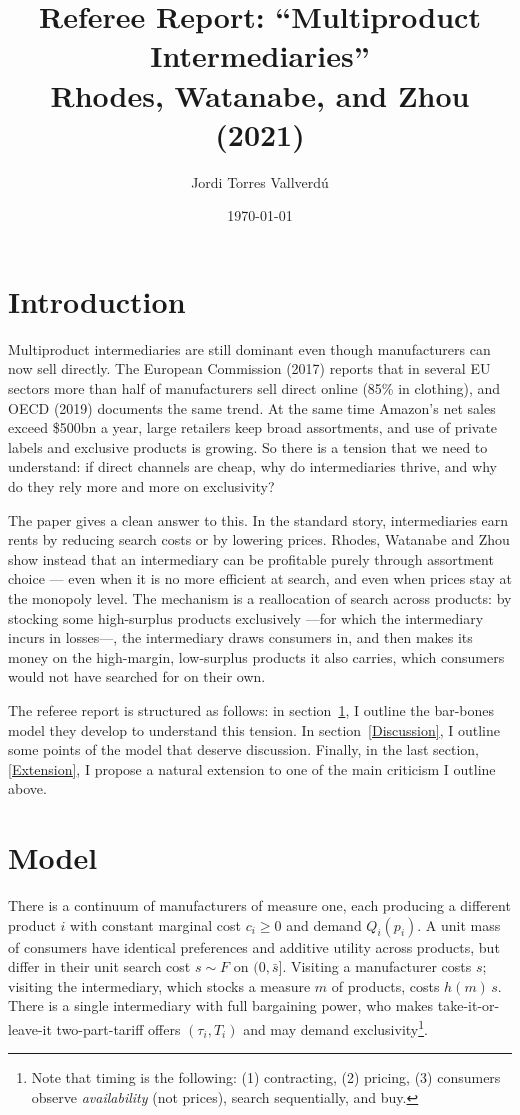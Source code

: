 \documentclass[11pt]{article}
\title{Referee Report: ``Multiproduct Intermediaries'' \\ \small Rhodes, Watanabe, and Zhou (2021)}
\author{Jordi Torres Vallverdú}
\date{\today}
\begin{document}
\maketitle
\vspace{-2em}

\section*{Introduction}
Multiproduct intermediaries are still dominant even though manufacturers can now sell directly. The European Commission (2017) reports that in several EU sectors more than half of manufacturers sell direct online (85\% in clothing), and OECD (2019) documents the same trend. At the same time Amazon's net sales exceed \$500bn a year, large retailers keep broad assortments, and use of private labels and exclusive products is growing. So there is a tension that we need to understand: if direct channels are cheap, why do intermediaries thrive, and why do they rely more and more on exclusivity?

The paper gives a clean answer to this. In the standard story, intermediaries earn rents by reducing search costs or by lowering prices. Rhodes, Watanabe and Zhou show instead that an intermediary can be profitable purely through assortment choice --- even when it is no more efficient at search, and even when prices stay at the monopoly level. The mechanism is a reallocation of search across products: by stocking some high-surplus products exclusively ---for which the intermediary incurs in losses---, the intermediary draws consumers in, and then makes its money on the high-margin, low-surplus products it also carries, which consumers would not have searched for on their own.

The referee report is structured as follows: in section~\ref{model}, I outline the bar-bones model they develop to understand this tension. In section~\ref{Discussion}, I outline some points of the model that deserve discussion. Finally, in the last section, \ref{Extension}, I propose a natural extension to one of the main criticism I outline above. 

\section{Model}
\label{model}

There is a continuum of manufacturers of measure one, each producing a different product $i$ with constant marginal cost $c_i\geq 0$ and demand $Q_i(p_i)$. A unit mass of consumers have identical preferences and additive utility across products, but differ in their unit search cost $s\sim F$ on $(0,\bar{s}]$. Visiting a manufacturer costs $s$; visiting the intermediary, which stocks a measure $m$ of products, costs $h(m)\,s$. There is a single intermediary with full bargaining power, who makes take-it-or-leave-it two-part-tariff offers $(\tau_i, T_i)$ and may demand exclusivity\footnote{Note that timing is the following: (1) contracting, (2) pricing, (3) consumers observe \emph{availability} (not prices), search sequentially, and buy.}.
\end{document}

